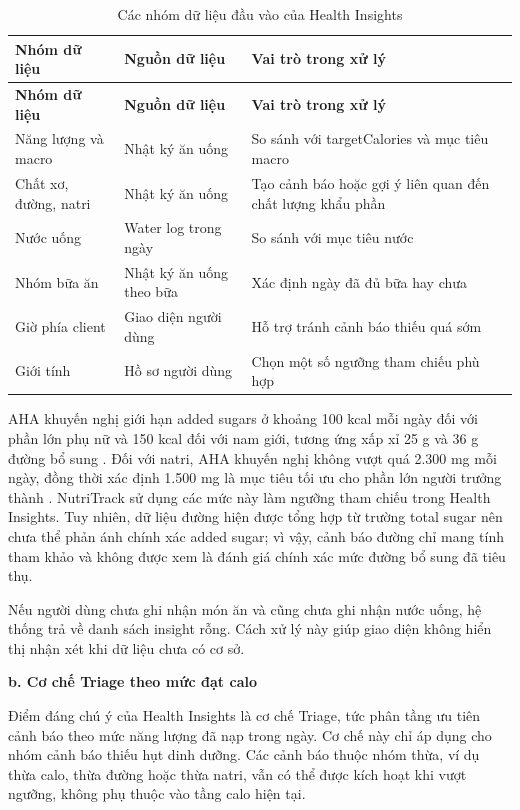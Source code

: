 \documentclass[12pt, a4paper]{report}
\begin{document}
\begin{longtable}{|>{\raggedright\arraybackslash}p{4cm}|>{\raggedright\arraybackslash}p{4cm}|p{7cm}|}
\caption{Các nhóm dữ liệu đầu vào của Health Insights}
\label{tab:health_insights_data} \\
\hline
\textbf{Nhóm dữ liệu} & \textbf{Nguồn dữ liệu} & \textbf{Vai trò trong xử lý} \\
\hline
\endfirsthead
\hline
\textbf{Nhóm dữ liệu} & \textbf{Nguồn dữ liệu} & \textbf{Vai trò trong xử lý} \\
\hline
\endhead

Năng lượng và macro & Nhật ký ăn uống & So sánh với targetCalories và mục tiêu macro \\
\hline
Chất xơ, đường, natri & Nhật ký ăn uống & Tạo cảnh báo hoặc gợi ý liên quan đến chất lượng khẩu phần \\
\hline
Nước uống & Water log trong ngày & So sánh với mục tiêu nước \\
\hline
Nhóm bữa ăn & Nhật ký ăn uống theo bữa & Xác định ngày đã đủ bữa hay chưa \\
\hline
Giờ phía client & Giao diện người dùng & Hỗ trợ tránh cảnh báo thiếu quá sớm \\
\hline
Giới tính & Hồ sơ người dùng & Chọn một số ngưỡng tham chiếu phù hợp \\
\hline
\end{longtable}


AHA khuyến nghị giới hạn added sugars ở khoảng 100 kcal mỗi ngày đối với phần lớn phụ nữ và 150 kcal đối với nam giới, tương ứng xấp xỉ 25 g và 36 g đường bổ sung \cite{aha_addedsugars}. Đối với natri, AHA khuyến nghị không vượt quá 2.300 mg mỗi ngày, đồng thời xác định 1.500 mg là mục tiêu tối ưu cho phần lớn người trưởng thành \cite{aha_sodium}. NutriTrack sử dụng các mức này làm ngưỡng tham chiếu trong Health Insights. Tuy nhiên, dữ liệu đường hiện được tổng hợp từ trường total sugar nên chưa thể phản ánh chính xác added sugar; vì vậy, cảnh báo đường chỉ mang tính tham khảo và không được xem là đánh giá chính xác mức đường bổ sung đã tiêu thụ.

Nếu người dùng chưa ghi nhận món ăn và cũng chưa ghi nhận nước uống, hệ thống trả về danh sách insight rỗng. Cách xử lý này giúp giao diện không hiển thị nhận xét khi dữ liệu chưa có cơ sở.

\textbf{b. Cơ chế Triage theo mức đạt calo}

Điểm đáng chú ý của Health Insights là cơ chế Triage, tức phân tầng ưu tiên cảnh báo theo mức năng lượng đã nạp trong ngày. Cơ chế này chỉ áp dụng cho nhóm cảnh báo thiếu hụt dinh dưỡng. Các cảnh báo thuộc nhóm thừa, ví dụ thừa calo, thừa đường hoặc thừa natri, vẫn có thể được kích hoạt khi vượt ngưỡng, không phụ thuộc vào tầng calo hiện tại.
\end{document}
